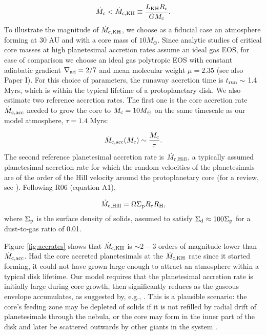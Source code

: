 \begin{equation}
\label{eq:McdotKH}
\dot{M_{\rm c}}<\dot{M}_{\rm c, KH} \equiv \frac{L_{\rm KH} R_{\rm c}}{G M_{\rm c}}.
\end{equation} 
To illustrate the magnitude of $\dot{M}_{\rm c, KH}$, we choose as a fiducial case an atmosphere forming at 30 AU and with a core mass of $10 M_{\oplus}$. Since analytic studies of critical core masses at high planetesimal accretion rates assume an ideal gas EOS, for ease of comparison we choose an ideal gas polytropic EOS with constant adiabatic gradient $\nabla_{\rm ad}=2/7$ and mean molecular weight $\mu=2.35$ (see also Paper I). For this choice of parameters, the runaway accretion time is $t _{\rm run}\sim$ 1.4 Myrs, which is within the typical lifetime of a protoplanetary disk. We also estimate two reference accretion rates. The first one is the core accretion rate $\dot{M}_{\rm c, acc}$ needed to grow the core to $M_{\rm c}=10 M_{\oplus}$ on the same timescale as our model atmosphere, $\tau=1.4$ Myrs:

\begin{equation}
\label{eq:Mcdot}
\dot{M}_{\rm{c,acc}}(M_{\rm{c}}) \sim \frac{M_{\rm{c}}}{\tau}.
\end{equation}
The second reference planetesimal accretion rate is $\dot{M}_{\rm c, Hill}$, a typically assumed planetesimal accretion rate for which the random velocities of the planetesimals are of the order of the Hill velocity around the protoplanetary core (for a review, see \citealt{goldreich04}). Following R06 (equation A1),


\begin{equation}
\label{eq:MdotHill}
\dot{M}_{\rm{c,Hill}}=\Omega \Sigma_{\rm p} R_{\rm c} R_{\rm H},
\end{equation}
where $\Sigma_{\rm p}$ is the surface density of solids, assumed to satisfy $\Sigma_{\rm d} \approx 100 \Sigma_{\rm p}$ for a dust-to-gas ratio of 0.01.

Figure \ref{fig:accrates} shows that $\dot{M}_{\rm c,KH}$ is $\sim2-3$ orders of magnitude lower than $\dot{M}_{\rm c, acc}$. Had the core accreted planetesimals at the $\dot{M}_{\rm c, KH}$ rate since it started forming, it could not have grown large enough to attract an atmosphere within a typical disk lifetime. Our model requires that the planetesimal accretion rate is initially large during core growth, then significantly reduces as the gaseous envelope accumulates, as suggested by, e.g., \citet{pollack96}. This is a plausible scenario: the core's feeding zone may be depleted of solids if it is not refilled by radial drift of planetesimals through the nebula, or the core may form in the inner part of the disk and later be scattered outwards by other giants in the system \citep{ida13}. 

